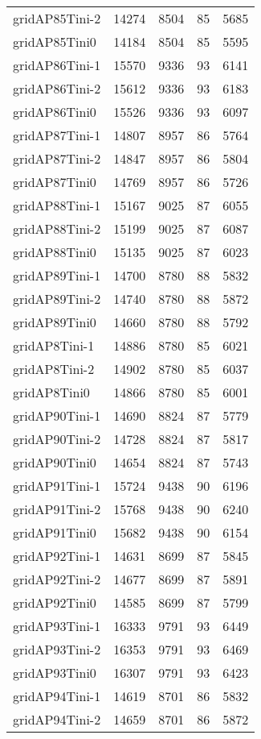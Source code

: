 \begin{longtable}{lrrrr}
gridAP85Tini-2 & 14274 & 8504 & 85 & 5685 \\
gridAP85Tini0 & 14184 & 8504 & 85 & 5595 \\
gridAP86Tini-1 & 15570 & 9336 & 93 & 6141 \\
gridAP86Tini-2 & 15612 & 9336 & 93 & 6183 \\
gridAP86Tini0 & 15526 & 9336 & 93 & 6097 \\
gridAP87Tini-1 & 14807 & 8957 & 86 & 5764 \\
gridAP87Tini-2 & 14847 & 8957 & 86 & 5804 \\
gridAP87Tini0 & 14769 & 8957 & 86 & 5726 \\
gridAP88Tini-1 & 15167 & 9025 & 87 & 6055 \\
gridAP88Tini-2 & 15199 & 9025 & 87 & 6087 \\
gridAP88Tini0 & 15135 & 9025 & 87 & 6023 \\
gridAP89Tini-1 & 14700 & 8780 & 88 & 5832 \\
gridAP89Tini-2 & 14740 & 8780 & 88 & 5872 \\
gridAP89Tini0 & 14660 & 8780 & 88 & 5792 \\
gridAP8Tini-1 & 14886 & 8780 & 85 & 6021 \\
gridAP8Tini-2 & 14902 & 8780 & 85 & 6037 \\
gridAP8Tini0 & 14866 & 8780 & 85 & 6001 \\
gridAP90Tini-1 & 14690 & 8824 & 87 & 5779 \\
gridAP90Tini-2 & 14728 & 8824 & 87 & 5817 \\
gridAP90Tini0 & 14654 & 8824 & 87 & 5743 \\
gridAP91Tini-1 & 15724 & 9438 & 90 & 6196 \\
gridAP91Tini-2 & 15768 & 9438 & 90 & 6240 \\
gridAP91Tini0 & 15682 & 9438 & 90 & 6154 \\
gridAP92Tini-1 & 14631 & 8699 & 87 & 5845 \\
gridAP92Tini-2 & 14677 & 8699 & 87 & 5891 \\
gridAP92Tini0 & 14585 & 8699 & 87 & 5799 \\
gridAP93Tini-1 & 16333 & 9791 & 93 & 6449 \\
gridAP93Tini-2 & 16353 & 9791 & 93 & 6469 \\
gridAP93Tini0 & 16307 & 9791 & 93 & 6423 \\
gridAP94Tini-1 & 14619 & 8701 & 86 & 5832 \\
gridAP94Tini-2 & 14659 & 8701 & 86 & 5872 \\

\end{longtable}
